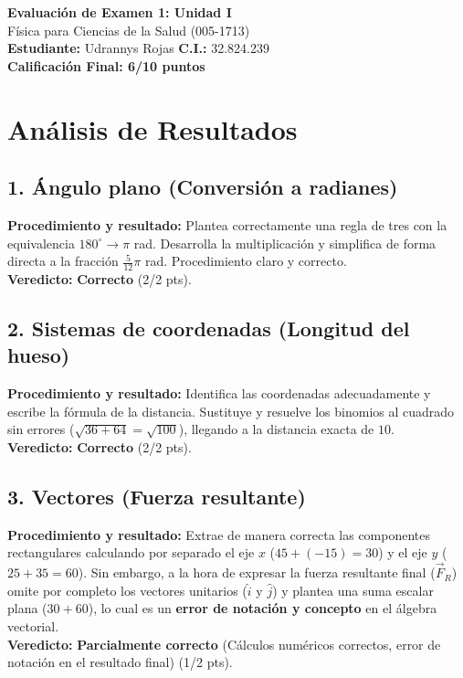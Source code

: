 \documentclass[12pt]{article}
\begin{document}
\begin{center}
    \Large \textbf{Evaluación de Examen 1: Unidad I} \\
    \large Física para Ciencias de la Salud (005-1713) \\
    \vspace{0.5cm}
    \textbf{Estudiante:} Udrannys Rojas \quad \textbf{C.I.:} 32.824.239
    \vspace{0.3cm} \\
    \large \textbf{Calificación Final: 6/10 puntos}
\end{center}

\vspace{0.5cm}

\section*{Análisis de Resultados}

\subsection*{1. Ángulo plano (Conversión a radianes)}
\textbf{Procedimiento y resultado:} Plantea correctamente una regla de tres con la equivalencia $180^\circ \rightarrow \pi$ rad. Desarrolla la multiplicación y simplifica de forma directa a la fracción $\frac{5}{12}\pi$ rad. Procedimiento claro y correcto. \\
\textbf{Veredicto:} \textbf{Correcto} (2/2 pts).

\subsection*{2. Sistemas de coordenadas (Longitud del hueso)}
\textbf{Procedimiento y resultado:} Identifica las coordenadas adecuadamente y escribe la fórmula de la distancia. Sustituye y resuelve los binomios al cuadrado sin errores ($\sqrt{36+64} = \sqrt{100}$), llegando a la distancia exacta de $10$. \\
\textbf{Veredicto:} \textbf{Correcto} (2/2 pts).

\subsection*{3. Vectores (Fuerza resultante)}
\textbf{Procedimiento y resultado:} Extrae de manera correcta las componentes rectangulares calculando por separado el eje $x$ ($45 + (-15) = 30$) y el eje $y$ ($25 + 35 = 60$). Sin embargo, a la hora de expresar la fuerza resultante final ($\vec{F}_R$) omite por completo los vectores unitarios ($\hat{i}$ y $\hat{j}$) y plantea una suma escalar plana ($30 + 60$), lo cual es un \textbf{error de notación y concepto} en el álgebra vectorial. \\
\textbf{Veredicto:} \textbf{Parcialmente correcto} (Cálculos numéricos correctos, error de notación en el resultado final) (1/2 pts).
\end{document}
